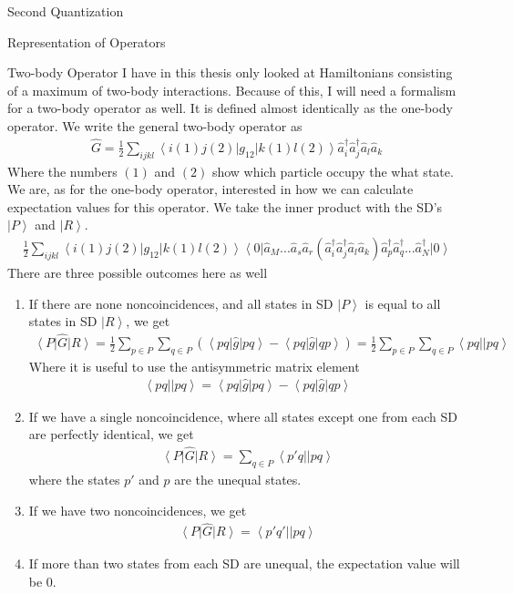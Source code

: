 \documentclass[twoside,english]{uiofysmaster}
\begin{document}
\begin{chapter}{Second Quantization}
\begin{section}{Representation of Operators}
		\begin{subsection}{Two-body Operator}
			I have in this thesis only looked at Hamiltonians consisting of a maximum of two-body interactions. Because of this, I will need a formalism for a two-body operator as well. It is defined almost identically as the one-body operator. We write the general two-body operator as
			\begin{align}
				\hat G = \frac{1}{2} \sum_{ijkl} \left< i(1) j(2) \right| g_{12} \left| k(1) l(2) \right> \hat a_i^\dagger \hat a_j^\dagger \hat a_l \hat a_k
			\end{align}
			Where the numbers $(1)$ and $(2)$ show which particle occupy the what state. We are, as for the one-body operator, interested in how we can calculate expectation values for this operator. We take the inner product with the SD's $\left| P \right>$ and $\left| R\right>$.
			\begin{align}
				\frac{1}{2} \sum_{ijkl} \left< i(1) j(2) \right| g_{12} \left| k(1) l(2) \right>   \left< 0 \right| \hat a_M ... \hat a_s \hat a_r (\hat a_i^\dagger \hat a_j^\dagger \hat a_l \hat a_k) \hat a_p^\dagger \hat a_q^\dagger ... \hat a_N^\dagger \left| 0 \right>
			\end{align}
			There are three possible outcomes here as well 
			\begin{enumerate}
				\item If there are none noncoincidences, and all states in SD $\left| P \right>$ is equal to all states in SD $\left| R \right>$, we get 
				\begin{align}
				 	\left< P \right| \hat G \left| R \right> = \frac{1}{2}\sum_{p \in P}\sum_{q \in P} (\left< pq\right| \hat g \left| pq \right> - \left< pq\right| \hat g \left| qp \right> ) = \frac{1}{2}\sum_{p \in P}\sum_{q \in P} \left< pq || pq \right>
				\end{align}
				Where it is useful to use the antisymmetric matrix element
				\begin{align}
					\left< pq || pq \right> = \left< pq\right| \hat g \left| pq \right> - \left< pq\right| \hat g \left| qp \right>  
				\end{align}
				\item If we have a single noncoincidence, where all states except one from each SD are perfectly identical, we get \cite{ShavittAndBartlett}
				\begin{align}
					\left< P \right| \hat G \left| R \right> = \sum_{q \in P} \left< p' q || p q \right>
				\end{align}
				where the states $p'$ and $p$ are the unequal states. 
				\item If we have two noncoincidences, we get 
				\begin{align}
					\left< P \right| \hat G \left| R \right> = \left< p' q' || p q \right> 
				\end{align}
				\item If more than two states from each SD are unequal, the expectation value will be $0$.
			\end{enumerate}
		\end{subsection}


\end{section}
\end{chapter}
\end{document}

